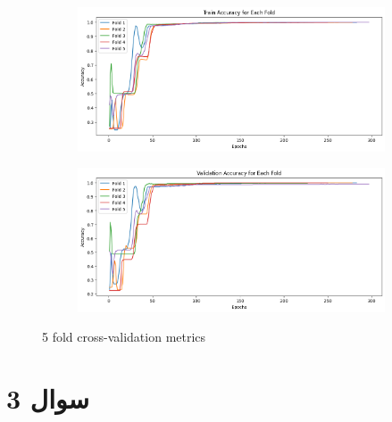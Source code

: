 \documentclass{article}
\begin{document}
\begin{figure}[H]
    \begin{subfigure}[b]{0.45\textwidth}
        \centering
        \includegraphics[width=\textwidth]{img/Q2/trainmf.png}
        \label{fig:image4}
    \end{subfigure}
    \hfill
    \begin{subfigure}[b]{0.45\textwidth}
        \centering
        \includegraphics[width=\textwidth]{img/Q2/valmf.png}
        \label{fig:image5}
    \end{subfigure}
    
    \caption{5 fold cross-validation metrics}
    \label{fig:five_images_m}
\end{figure}

\section{سوال 3}
\end{document}
